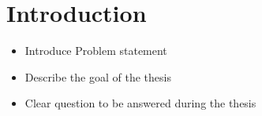\chapter{Introduction}

\begin{itemize}
\item Introduce Problem statement
\item Describe the goal of the thesis
\item Clear question to be answered during the thesis
\end{itemize}